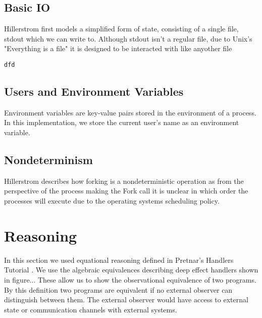 \documentclass[logo,bsc,singlespacing,parskip]{infthesis}
\begin{document}
\section{Basic IO}
Hillerstrom first models a simplified form of state, consisting of a single file, stdout which we can write to. Although stdout isn't a regular file, due to Unix's "Everything is a file" it is designed to be interacted with like anyother file
\begin{lstlisting}
dfd
\end{lstlisting}

\section{Users and Environment Variables}
Environment variables are key-value pairs stored in the environment of a process. In this implementation, we store the current user's name as an environment variable.

\section{Nondeterminism}

Hillerstrom describes how forking is a nondeterministic operation as from the perspective of the process making the Fork call it is unclear in which order the processes will execute due to the operating systems scheduling policy. 

\chapter{Reasoning}

In this section we used equational reasoning defined in Pretnar's Handlers Tutorial \cite{pretnar_introduction_2015}. We use the algebraic equivalences describing deep effect handlers shown in figure... These allow us to show the observational equivalence of two programs. By this definition two programs are equivalent if no external observer can distinguish between them. 
The external observer would have access to external state or communication channels with external systems.
\end{document}
